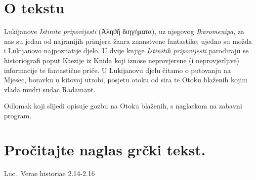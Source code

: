 


\section*{O tekstu}

Lukijanove \textit{Istinite pripovijesti} (Ἀληϑῆ διηγήματα), uz njegovog \textit{Ikaromenipa}, za nas su jedan od najranijih primjera žanra znanstvene fantastike; ujedno su možda i Lukijanovo najpoznatije djelo. U dvije knjige \textit{Istinitih pripovijesti} parodiraju se historiografi poput Ktezije iz Knida koji iznose neprovjerene (i neprovjerljive) informacije te fantastične priče. U Lukijanovu djelu čitamo o putovanju na Mjesec, boravku u kitovoj utrobi, posjetu otoku od sira te Otoku blaženih kojim vlada mudri sudac Radamant. 

Odlomak koji slijedi opisuje gozbu na Otoku blaženih, s naglaskom na zabavni program.


\section*{Pročitajte naglas grčki tekst.}

Luc.\ Verae historiae 2.14-2.16


\medskip


